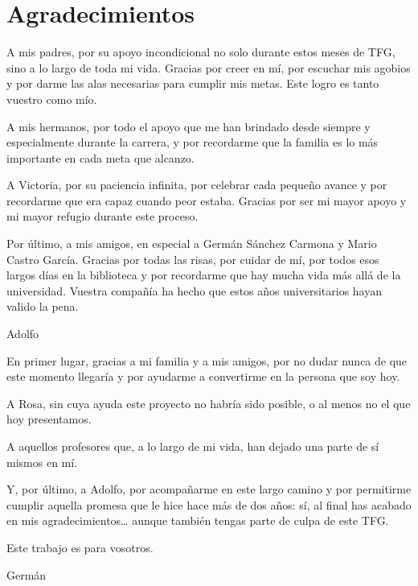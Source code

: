 \chapter*{Agradecimientos}

A mis padres, por su apoyo incondicional no solo durante estos meses de TFG, sino a lo largo de toda mi vida. Gracias por creer en mí, por escuchar mis agobios y por darme las alas necesarias para cumplir mis metas. Este logro es tanto vuestro como mío.

\bigskip

A mis hermanos, por todo el apoyo que me han brindado desde siempre y especialmente durante la carrera, y por recordarme que la familia es lo más importante en cada meta que alcanzo.

\bigskip

A Victoria, por su paciencia infinita, por celebrar cada pequeño avance y por recordarme que era capaz cuando peor estaba. Gracias por ser mi mayor apoyo y mi mayor refugio durante este proceso.

\bigskip

Por último, a mis amigos, en especial a Germán Sánchez Carmona y Mario Castro García. Gracias por todas las risas, por cuidar de mí, por todos esos largos días en la biblioteca y por recordarme que hay mucha vida más allá de la universidad. Vuestra compañía ha hecho que estos años universitarios hayan valido la pena.

\bigskip

\begin{flushright}
Adolfo
\end{flushright}

\newpage

En primer lugar, gracias a mi familia y a mis amigos, por no dudar nunca de que este momento llegaría y por ayudarme a convertirme en la persona que soy hoy.

\bigskip

A Rosa, sin cuya ayuda este proyecto no habría sido posible, o al menos no el que hoy presentamos.

\bigskip

A aquellos profesores que, a lo largo de mi vida, han dejado una parte de sí mismos en mí.

\bigskip

Y, por último, a Adolfo, por acompañarme en este largo camino y por permitirme cumplir aquella promesa que le hice hace más de dos años: sí, al final has acabado en mis agradecimientos… aunque también tengas parte de culpa de este TFG.

\bigskip

Este trabajo es para vosotros.

\bigskip

\begin{flushright}
Germán
\end{flushright}
